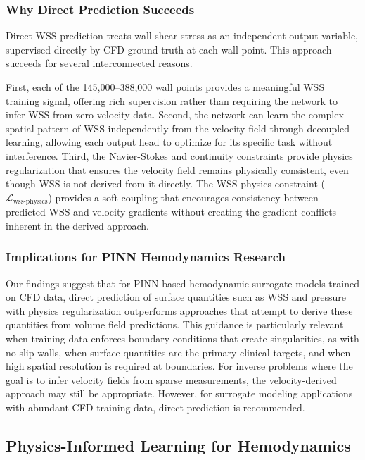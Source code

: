 \documentclass[12pt,a4paper]{article}
\begin{document}
\subsubsection{Why Direct Prediction Succeeds}

Direct WSS prediction treats wall shear stress as an independent output variable, supervised directly by CFD ground truth at each wall point. This approach succeeds for several interconnected reasons.

First, each of the 145,000--388,000 wall points provides a meaningful WSS training signal, offering rich supervision rather than requiring the network to infer WSS from zero-velocity data. Second, the network can learn the complex spatial pattern of WSS independently from the velocity field through decoupled learning, allowing each output head to optimize for its specific task without interference. Third, the Navier-Stokes and continuity constraints provide physics regularization that ensures the velocity field remains physically consistent, even though WSS is not derived from it directly. The WSS physics constraint ($\mathcal{L}_{\text{wss-physics}}$) provides a soft coupling that encourages consistency between predicted WSS and velocity gradients without creating the gradient conflicts inherent in the derived approach.

\subsubsection{Implications for PINN Hemodynamics Research}

Our findings suggest that for PINN-based hemodynamic surrogate models trained on CFD data, direct prediction of surface quantities such as WSS and pressure with physics regularization outperforms approaches that attempt to derive these quantities from volume field predictions. This guidance is particularly relevant when training data enforces boundary conditions that create singularities, as with no-slip walls, when surface quantities are the primary clinical targets, and when high spatial resolution is required at boundaries. For inverse problems where the goal is to infer velocity fields from sparse measurements, the velocity-derived approach may still be appropriate. However, for surrogate modeling applications with abundant CFD training data, direct prediction is recommended.

\subsection{Physics-Informed Learning for Hemodynamics}
\end{document}
